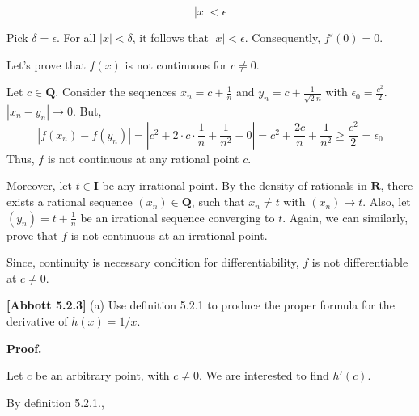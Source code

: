 \documentclass[10pt]{article}
\begin{document}
\begin{equation*}
|x|< \epsilon 
\end{equation*}


Pick $\displaystyle \delta =\epsilon .$ For all $\displaystyle |x|< \delta $, it follows that $\displaystyle |x|< \epsilon $. Consequently, $\displaystyle f'( 0) =0$.



Let's prove that $\displaystyle f( x)$ is not continuous for $\displaystyle c\neq 0$. 



Let $\displaystyle c\in \mathbf{Q}$. Consider the sequences $\displaystyle x_{n} =c+\frac{1}{n}$ and $\displaystyle y_{n} =c+\frac{1}{\sqrt{2} n}$ with $\displaystyle \epsilon _{0} =\frac{c^{2}}{2}$. $\displaystyle |x_{n} -y_{n} |\rightarrow 0$. But,
\begin{equation*}
|f( x_{n}) -f( y_{n}) |=\left| c^{2} +2\cdot c\cdot \frac{1}{n} +\frac{1}{n^{2}} -0\right| =c^{2} +\frac{2c}{n} +\frac{1}{n^{2}} \geq \frac{c^{2}}{2} =\epsilon _{0}
\end{equation*}
Thus, $\displaystyle f$ is not continuous at any rational point $\displaystyle c$.



Moreover, let $\displaystyle t\in \mathbf{I}$ be any irrational point. By the density of rationals in $\displaystyle \mathbf{R}$, there exists a rational sequence $\displaystyle ( x_{n}) \in \mathbf{Q}$, such that $\displaystyle x_{n} \neq t$ with $\displaystyle ( x_{n})\rightarrow t$. Also, let $\displaystyle ( y_{n}) =t+\frac{1}{n}$ be an irrational sequence converging to $\displaystyle t$. Again, we can similarly, prove that $\displaystyle f$ is not continuous at an irrational point.



Since, continuity is necessary condition for differentiability, $\displaystyle f$ is not differentiable at $\displaystyle c\neq 0$.



\textbf{[Abbott 5.2.3]} (a) Use definition 5.2.1 to produce the proper formula for the derivative of $\displaystyle h( x) =1/x$. 



\textbf{Proof.}



Let $\displaystyle c$ be an arbitrary point, with $\displaystyle c\neq 0$. We are interested to find $\displaystyle h'( c)$. 

By definition 5.2.1.,
\end{document}
